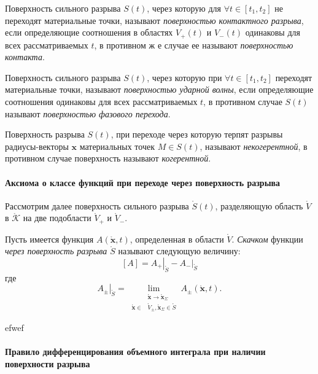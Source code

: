 	\begin{definition}
	Поверхность сильного разрыва $S(t)$, через которую для $\forall t\in [t_1,t_2]$ не переходят материальные точки, называют
	\textit{поверхностью контактного разрыва}, если определяющие соотношения в областях $V_+(t)$ и $V_-(t)$ одинаковы для всех рассматриваемых $t$, в противном ж е случае ее называют \textit{поверхностью контакта}.
	\end{definition}
	\begin{definition}
		Поверхность сильного разрыва $S(t)$, через которую при
	$\forall t\in [t_1,t_2]$ переходят материальные точки, называют \textit{поверхностью ударной волны}, если определяющие соотношения одинаковы для всех рассматриваемых $t$, в противном случае $S(t)$ называют \textit{поверхностью фазового перехода}.
	\end{definition}
	
	\begin{definition}
		Поверхность разрыва $S(t)$, при переходе через которую
		терпят разрывы радиусы-векторы $\mathbf{x}$ материальных точек $M \in S(t)$, называют \textit{некогерентной}, в противном случае поверхность называют \textit{когерентной}.
	\end{definition}
	
\paragraph{Аксиома о классе функций при переходе через поверхность разрыва}
Рассмотрим далее поверхность сильного разрыва $\mathring{S}(t)$, разделяющую область $\mathring{V}$ в $\mathring{\mathcal{K}}$ на две подобласти $\mathring{V}_+$ и $\mathring{V}_-$.

\begin{definition}
	Пусть имеется функция $A(\mathring{\mathbf{x}},t)$, определенная в области $\mathring{V}$. \textit{Скачком} функции \textit{через поверхность разрыва $\mathring{S}$} называют следующую величину:
	\[
	[A]=\left.A_+\right|_{\mathring{S}}-\left.A_-\right|_{\mathring{S}}
	\]
	где
	\[
	\left.A_{\pm}\right|_{\mathring{S}}=\lim_{
		\begin{aligned}
			&\mathring{\mathbf{x}}\to\mathring{\mathbf{x}}_\Sigma\\
			\mathring{\mathbf{x}}\in&\mathring{V}_{\pm},\mathring{\mathbf{x}}_\Sigma\in\mathring{S}
		\end{aligned}}A_{\pm}(\mathring{\mathbf{x}},t).
	\]
\end{definition}

\begin{axiom*}
	efwef
\end{axiom*}

\paragraph{Правило дифференцирования объемного интеграла при наличии поверхности разрыва}

